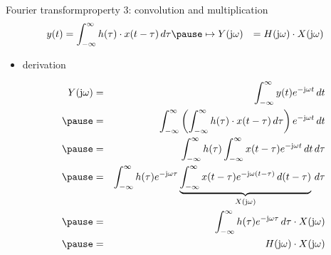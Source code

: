 	\begin{frame}{Fourier transform}{property 3: convolution and multiplication}
		\vspace{-7mm}
        \begin{eqnarray*}
			y(t) &= \int_{-\infty}^{\infty} {h(\tau) \cdot x(t-\tau)\, d\tau}\pause\mapsto 
			Y(\jom) &= H(\jom)\cdot X(\jom) \nonumber
		\end{eqnarray*}
		\pause
		\begin{itemize}
			\item[]	derivation
					\begin{footnotesize}
				\begin{eqnarray*}
					Y(\jom)	&=& \int_{-\infty}^{\infty} {y(t) \e^{-\jom t}\, dt}\nonumber\\
							\pause
								&=& \int_{-\infty}^{\infty} {\left(\int_{-\infty}^{\infty} {h(\tau) \cdot x(t-\tau)\, d\tau}\right) \e^{-\jom t}\, dt}\nonumber\\
							\pause
								&=& \int_{-\infty}^{\infty} {h(\tau) \int_{-\infty}^{\infty} {x(t-\tau)} \e^{-\jom t}\, dt\, d\tau}\nonumber\\
							\pause
								&=& \int_{-\infty}^{\infty} {h(\tau)  \e^{-\jom \tau} \underbrace{\int_{-\infty}^{\infty} {x(t-\tau)} \e^{-\jom (t-\tau)}\, d(t-\tau)}_{X(\jom)}\, d\tau}\nonumber\\
							\pause
								&=& \int_{-\infty}^{\infty} {h(\tau) \e^{-\jom \tau}\, d\tau} \cdot X(\jom)\nonumber\\
							\pause
								&=& H(\jom) \cdot X(\jom)\label{eq:mult_conv} 
				\end{eqnarray*}
					\end{footnotesize}
		\end{itemize}
	\end{frame}	

